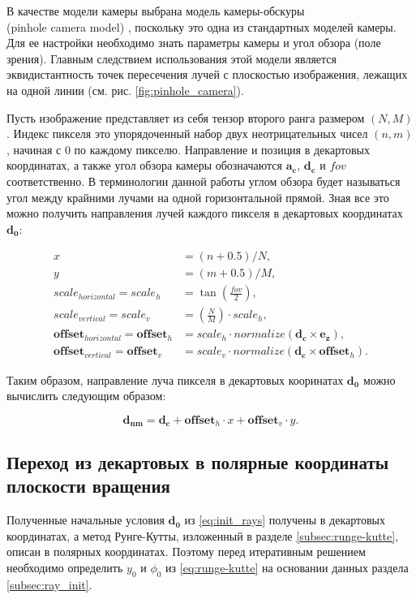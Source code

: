 В качестве модели камеры выбрана модель камеры-обскуры \\(pinhole camera model) \cite[стр.~47]{marrs2021ray}, поскольку это одна из стандартных моделей камеры. Для ее настройки необходимо знать параметры камеры и угол обзора (поле зрения). Главным следствием использования этой модели является эквидистантность точек пересечения лучей с плоскостью изображения, лежащих на одной линии (см. рис. \ref{fig:pinhole_camera}).

Пусть изображение представляет из себя тензор второго ранга размером $(N, M)$. Индекс пикселя это упорядоченный набор двух неотрицательных чисел $(n, m)$, начиная с $0$ по каждому пикселю. Направление и позиция в декартовых координатах, а также угол обзора камеры обозначаются $\mathbf{a_c}$, $\mathbf{d_c}$ и $fov$ соответственно. В терминологии данной работы углом обзора будет называться угол между крайними лучами на одной горизонтальной прямой. Зная все это можно получить направления лучей каждого пикселя в декартовых координатах $\mathbf{d_0}$:

\begin{align*}
    x &= (n + 0.5)/N, \\
    y &= (m + 0.5)/M, \\
    scale_{horizontal} = scale_h &= \tan{\left(\frac{fov}{2}\right)}, \\
    scale_{vertical} = scale_v &= \left(\frac{N}{M}\right) \cdot scale_h, \\
    \mathbf{offset}_{horizontal} = \mathbf{offset}_h &= scale_h \cdot normalize(\mathbf{d_c} \times \mathbf{e_z}), \\
    \mathbf{offset}_{vertical} = \mathbf{offset}_v &= scale_v \cdot normalize(\mathbf{d_c} \times \mathbf{offset}_h).
\end{align*}

Таким образом, направление луча пикселя в декартовых кооринатах $\mathbf{d_0}$ можно вычислить следующим образом:

\begin{equation}
\label{eq:init_rays}
    \mathbf{d_{nm}} = \mathbf{d_c} + \mathbf{offset}_{h} \cdot x + \mathbf{offset}_{v} \cdot y.
\end{equation}

\subsection{Переход из декартовых в полярные координаты плоскости вращения}

Полученные начальные условия $\mathbf{d_0}$ из \eqref{eq:init_rays} получены в декартовых координатах, а метод Рунге-Кутты, изложенный в разделе \ref{subsec:runge-kutte}, описан в полярных координатах. Поэтому перед итеративным решением необходимо определить $y_0$ и $\phi_0$ из \eqref{eq:runge-kutte} на основании данных раздела \ref{subsec:ray_init}.

